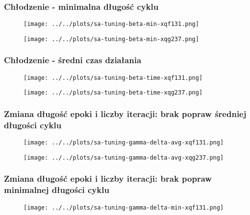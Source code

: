 \documentclass{article}
\begin{document}
\newpage

\subsubsection*{Chłodzenie - minimalna długość cyklu}
    \begin{figure}[h!]
        \centering
        \texttt{[image: ../../plots/sa-tuning-beta-min-xqf131.png]}
    \end{figure}
    
    \begin{figure}[h!]
        \centering
        \texttt{[image: ../../plots/sa-tuning-beta-min-xqg237.png]}
    \end{figure}

\newpage

\subsubsection*{Chłodzenie - średni czas działania}
    \begin{figure}[h!]
        \centering
        \texttt{[image: ../../plots/sa-tuning-beta-time-xqf131.png]}
    \end{figure}
    
    \begin{figure}[h!]
        \centering
        \texttt{[image: ../../plots/sa-tuning-beta-time-xqg237.png]}
    \end{figure}

\newpage

\subsubsection*{Zmiana długość epoki i liczby iteracji: brak popraw średniej długości cyklu}
    \begin{figure}[h!]
        \centering
        \texttt{[image: ../../plots/sa-tuning-gamma-delta-avg-xqf131.png]}
    \end{figure}

    \begin{figure}[h!]
        \centering
        \texttt{[image: ../../plots/sa-tuning-gamma-delta-avg-xqg237.png]}
    \end{figure}

\newpage

\subsubsection*{Zmiana długość epoki i liczby iteracji: brak popraw minimalnej długości cyklu}
    \begin{figure}[h!]
        \centering
        \texttt{[image: ../../plots/sa-tuning-gamma-delta-min-xqf131.png]}
    \end{figure}
\end{document}
